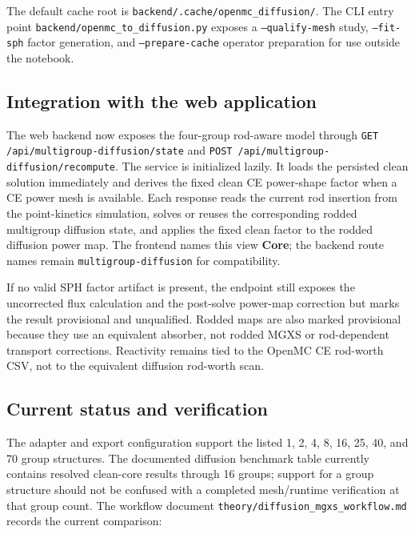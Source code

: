 \documentclass[11pt]{article}
\begin{document}
The default cache root is \texttt{backend/.cache/openmc\_diffusion/}.  The
CLI entry point \texttt{backend/openmc\_to\_diffusion.py} exposes a
\texttt{--qualify-mesh} study, \texttt{--fit-sph} factor generation, and
\texttt{--prepare-cache} operator preparation for use outside the notebook.

\subsection{Integration with the web application}

The web backend now exposes the four-group rod-aware model through
\texttt{GET /api/multigroup-diffusion/state} and
\texttt{POST /api/multigroup-diffusion/recompute}.  The service is initialized
lazily.  It loads the persisted clean solution immediately and derives the
fixed clean CE power-shape factor when a CE power mesh is available.  Each
response reads the current rod insertion from the point-kinetics simulation,
solves or reuses the corresponding rodded multigroup diffusion state, and
applies the fixed clean factor to the rodded diffusion power map.
The frontend names this view \textbf{Core}; the backend route names remain
\texttt{multigroup-diffusion} for compatibility.

If no valid SPH factor artifact is present, the endpoint still exposes the
uncorrected flux calculation and the post-solve power-map correction but marks
the result provisional and unqualified.  Rodded maps are also marked
provisional because they use an equivalent absorber, not rodded MGXS or
rod-dependent transport corrections.  Reactivity remains tied to the OpenMC CE
rod-worth CSV, not to the equivalent diffusion rod-worth scan.

\subsection{Current status and verification}

The adapter and export configuration support the listed 1, 2, 4, 8, 16, 25,
40, and 70 group structures.  The documented diffusion benchmark table
currently contains resolved clean-core results through 16 groups; support for a
group structure should not be confused with a completed mesh/runtime
verification at that group count.  The workflow document
\texttt{theory/diffusion\_mgxs\_workflow.md} records the current comparison:
\end{document}
